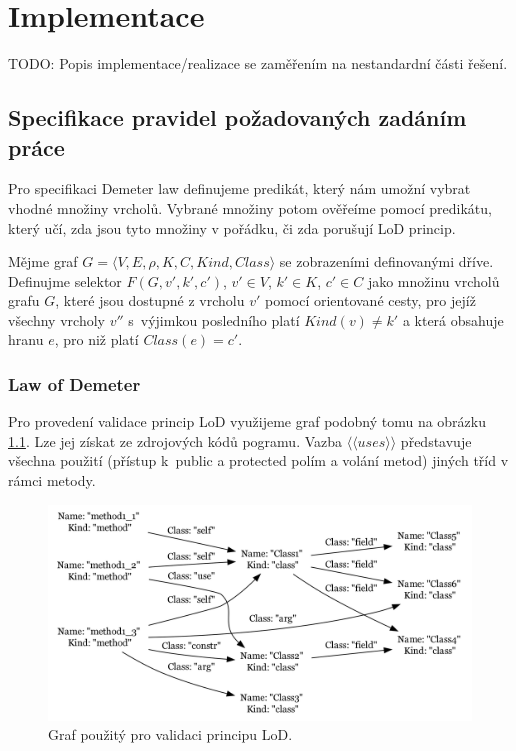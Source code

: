 \chapter{Implementace}

TODO: Popis implementace/realizace se zaměřením na nestandardní části řešení.

\section{Specifikace pravidel požadovaných zadáním práce}
Pro specifikaci Demeter law definujeme predikát, který nám umožní vybrat vhodné množiny vrcholů. Vybrané množiny potom ověřeíme pomocí predikátu, který učí, zda jsou tyto množiny v pořádku, či zda porušují LoD princip.

\begin{definition}
Mějme graf $G = \langle V, E, \rho, K, C, \mathit{Kind}, \mathit{Class}\rangle$ se zobrazeními definovanými dříve. Definujme selektor $F(G, v', k', c')$, $v' \in V$, $k' \in K$, $c' \in C$ jako množinu vrcholů grafu $G$, které jsou dostupné z vrcholu $v'$ pomocí orientované cesty, pro jejíž všechny vrcholy $v''$ s~výjimkou posledního platí $Kind(v) \ne k'$ a která obsahuje hranu $e$, pro niž platí $Class(e) = c' $.
\end{definition}

\subsection{Law of Demeter}
Pro provedení validace princip LoD využijeme graf podobný tomu na obrázku \ref{implementation-lod_graph}. Lze jej získat ze zdrojových kódů pogramu. Vazba $\langle\langle{}uses\rangle\rangle$ představuje všechna použití (přístup k~public a protected polím a volání metod) jiných tříd v rámci metody.

\begin{figure}[h!]
  \centering
  \includegraphics[width=1.0\textwidth]{./graphs/demeter_graph.png}
  \caption{Graf použitý pro validaci principu LoD.\label{implementation-lod_graph}}
\end{figure}

